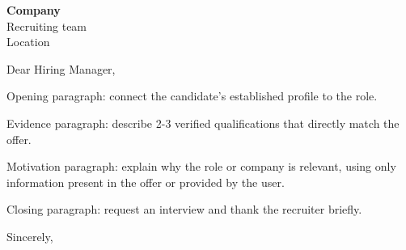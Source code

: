 \documentclass[a4paper,11pt]{letter}
\date{\today}
\begin{document}
\begin{letter}{\textbf{Company}\\Recruiting team\\Location}

\opening{Dear Hiring Manager,}

Opening paragraph: connect the candidate's established profile to the role.

Evidence paragraph: describe 2-3 verified qualifications that directly match the offer.

Motivation paragraph: explain why the role or company is relevant, using only information present in the offer or provided by the user.

Closing paragraph: request an interview and thank the recruiter briefly.

\closing{Sincerely,}

\end{letter}
\end{document}
